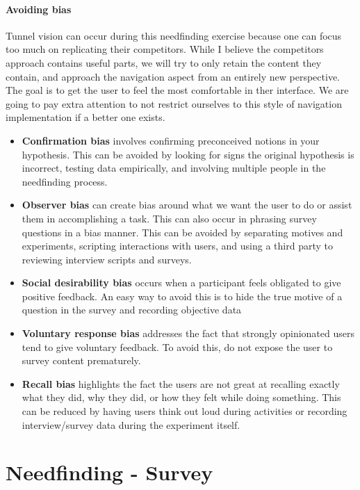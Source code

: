 \paragraph{Avoiding bias}
Tunnel vision can occur during this needfinding exercise because one can focus too much on replicating their competitors. While I believe the competitors approach contains useful parts, we will try to only retain the content they contain, and approach the navigation aspect from an entirely new perspective. The goal is to get the user to feel the most comfortable in ther interface. We are going to pay extra attention to not restrict ourselves to this style of navigation implementation if a better one exists.


\begin{itemize}
\item
  \textbf{Confirmation bias} involves confirming preconceived notions in your hypothesis. This can be avoided by looking for signs the original hypothesis is incorrect, testing data empirically, and involving multiple people in the needfinding process.
\item
  \textbf{Observer bias} can create bias around what we want the user to do or assist them in accomplishing a task. This can also occur in phrasing survey questions in a bias manner. This can be avoided by separating motives and experiments, scripting interactions with users, and using a third party to reviewing interview scripts and surveys.
\item
  \textbf{Social desirability bias} occurs when a participant feels obligated to give positive feedback. An easy way to avoid this is to hide the true motive of a question in the survey and recording objective data
\item
  \textbf{Voluntary response bias} addresses the fact that strongly opinionated users tend to give voluntary feedback. To avoid this, do not expose the user to survey content prematurely.
\item
  \textbf{Recall bias} highlights the fact the users are not great at recalling exactly what they did, why they did, or how they felt while doing something. This can be reduced by having users think out loud during activities or recording interview/survey data during the experiment itself.
\end{itemize}


\section{Needfinding - Survey}

